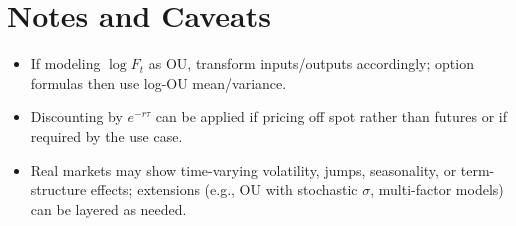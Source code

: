 \documentclass[12pt]{article}
\begin{document}
\section{Notes and Caveats}
\begin{itemize}
  \item If modeling $\log F_t$ as OU, transform inputs/outputs accordingly; option formulas then use log-OU mean/variance.
  \item Discounting by $e^{-r\tau}$ can be applied if pricing off spot rather than futures or if required by the use case.
  \item Real markets may show time-varying volatility, jumps, seasonality, or term-structure effects; extensions (e.g., OU with stochastic $\sigma$, multi-factor models) can be layered as needed.
\end{itemize}
\end{document}
